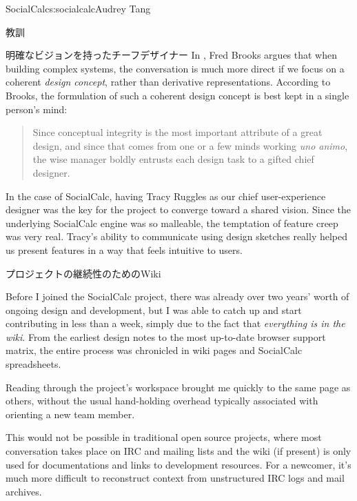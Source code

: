 \begin{aosachapter}{SocialCalc}{s:socialcalc}{Audrey Tang}
\begin{aosasect1}{教訓}
\begin{aosasect2}{明確なビジョンを持ったチーフデザイナー}
In \cite{bib:brooks:design}, Fred Brooks argues that when building
complex systems, the conversation is much more direct if we focus on a
coherent \emph{design concept}, rather than derivative
representations. According to Brooks, the formulation of such a
coherent design concept is best kept in a single person's mind:

\begin{quotation}

  \noindent
  Since conceptual integrity is the most important attribute of a
  great design, and since that comes from one or a few minds working
  \emph{uno animo}, the wise manager boldly entrusts each design task to a
  gifted chief designer.

\end{quotation}

In the case of SocialCalc, having Tracy Ruggles as our chief
user-experience designer was the key for the project to converge
toward a shared vision.  Since the underlying SocialCalc engine was
so malleable, the temptation of feature creep was very real. Tracy's
ability to communicate using design sketches really helped us
present features in a way that feels intuitive to users.

\end{aosasect2}

\begin{aosasect2}{プロジェクトの継続性のためのWiki}

Before I joined the SocialCalc project, there was already over two
years' worth of ongoing design and development, but I was able to
catch up and start contributing in less than a week, simply due to
the fact that \emph{everything is in the wiki}. From the earliest
design notes to the most up-to-date browser support matrix, the
entire process was chronicled in wiki pages and SocialCalc
spreadsheets.

Reading through the project's workspace brought me quickly to the same
page as others, without the usual hand-holding overhead
typically associated with orienting a new team member.

This would not be possible in traditional open source projects, where
most conversation takes place on IRC and mailing lists and the wiki
(if present) is only used for documentations and links to development
resources.  For a newcomer, it's much more difficult to reconstruct
context from unstructured IRC logs and mail archives.


\end{aosasect2}
\end{aosasect1}
\end{aosachapter}
